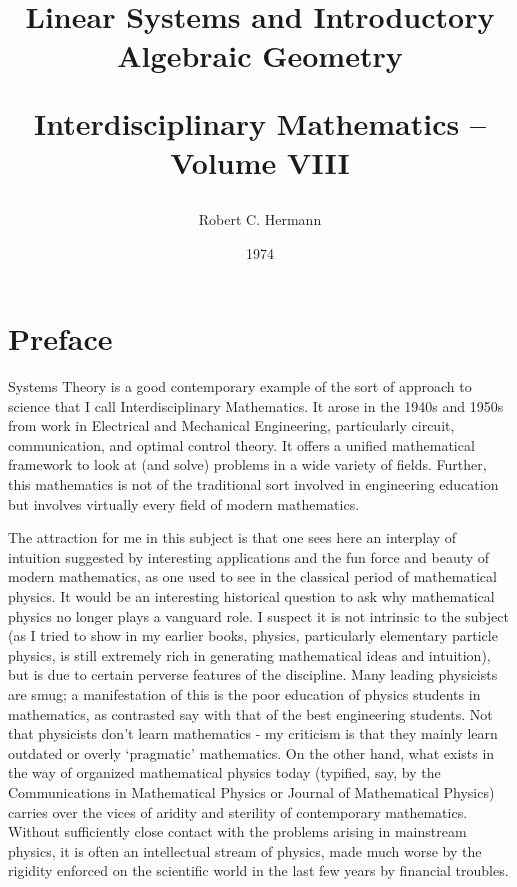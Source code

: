 \documentclass[12pt]{book}
\title{
    Linear Systems and Introductory Algebraic Geometry
    
    \begin{Large}
        Interdisciplinary Mathematics -- Volume VIII
    \end{Large}
}
\author{Robert C. Hermann}
\date{1974}
\theoremstyle{plain}
\theoremstyle{definition}
\begin{document}
\maketitle

\section{Preface}

Systems Theory is a good contemporary example of the sort of approach to science that I call Interdisciplinary Mathematics.
It arose in the 1940s and 1950s from work in Electrical and Mechanical Engineering, particularly circuit, communication, and optimal control theory.
It offers a unified mathematical framework to look at (and solve) problems in a wide variety of fields.
Further, this mathematics is not of the traditional sort involved in engineering education but involves virtually every field of modern mathematics.

The attraction for me in this subject is that one sees here an interplay of intuition suggested by interesting applications and the fun force and beauty of modern mathematics, as one used to see in the classical period of mathematical physics.
It would be an interesting historical question to ask why mathematical physics no longer plays a vanguard role.
I suspect it is not intrinsic to the subject (as I tried to show in my earlier books, physics, particularly elementary particle physics, is still extremely rich in generating mathematical ideas and intuition), but is due to certain perverse features of the discipline.
Many leading physicists are smug; a manifestation of this is the poor education of physics students in mathematics, as contrasted say with that of the best engineering students.
Not that physicists don't learn mathematics - my criticism is that they mainly learn outdated or overly `pragmatic' mathematics.
On the other hand, what exists in the way of organized mathematical physics today (typified, say, by the Communications in Mathematical Physics or Journal of Mathematical Physics) carries over the vices of aridity and sterility of contemporary mathematics.
Without sufficiently close contact with the problems arising in mainstream physics, it is often an intellectual stream of physics, made much worse by the rigidity enforced on the scientific world in the last few years by financial troubles.
\end{document}
